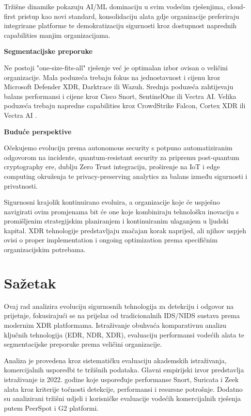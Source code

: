 \documentclass[utf8, seminar]{fer}
\begin{document}
Tržišne dinamike pokazuju AI/ML dominaciju u svim vodećim rješenjima, cloud-first pristup kao novi standard, konsolidaciju alata gdje organizacije preferiraju integrirane platforme te demokratizaciju sigurnosti kroz dostupnost naprednih capabilities manjim organizacijama.

\textbf{Segmentacijske preporuke}

Ne postoji "one-size-fits-all" rješenje već je optimalan izbor ovisan o veličini organizacije. Mala poduzeća trebaju fokus na jednostavnost i cijenu kroz Microsoft Defender XDR, Darktrace ili Wazuh. Srednja poduzeća zahtijevaju balans performansi i cijene kroz Cisco Snort, SentinelOne ili Vectra AI. Velika poduzeća trebaju napredne capabilities kroz CrowdStrike Falcon, Cortex XDR ili Vectra AI \cite{g2_crowdstrike_comparison, g2_cortex_comparison}.

\textbf{Buduće perspektive}

Očekujemo evoluciju prema autonomous security s potpuno automatiziranim odgovorom na incidente, quantum-resistant security za pripremu post-quantum cryptography ere, dublju Zero Trust integraciju, proširenje na IoT i edge computing okruženja te privacy-preserving analytics za balans između sigurnosti i privatnosti.

Sigurnosni krajolik kontinuirano evoluira, a organizacije koje će uspješno navigirati ovim promjenama bit će one koje kombiniraju tehnološku inovaciju s promišljenim strategijskim planiranjem i kontinuiranim ulaganjem u ljudski kapital. XDR tehnologije predstavljaju značajan korak naprijed, ali njihov uspjeh ovisi o proper implementation i ongoing optimization prema specifičnim organizacijskim potrebama.

\chapter{Sažetak}
Ovaj rad analizira evoluciju sigurnosnih tehnologija za detekciju i odgovor na prijetnje, fokusirajući se na prijelaz od tradicionalnih IDS/NIDS sustava prema modernim XDR platformama. Istraživanje obuhvaća komparativnu analizu ključnih tehnologija (EDR, NDR, XDR), evaluaciju performansi vodećih alata te segmentacijske preporuke prema veličini organizacije.

Analiza je provedena kroz sistematičku evaluaciju akademskih istraživanja, komercijalnih usporedbi te tržišnih podataka. Glavni empirijski izvor predstavlja istraživanje iz 2022. godine koje uspoređuje performanse Snort, Suricata i Zeek alata kroz kriterije točnosti detekcije, performansi i resursne potrošnje. Dodatno su analizirani tržišni udjeli i korisničke evaluacije vodećih komercijalnih rješenja putem PeerSpot i G2 platformi.
\end{document}
